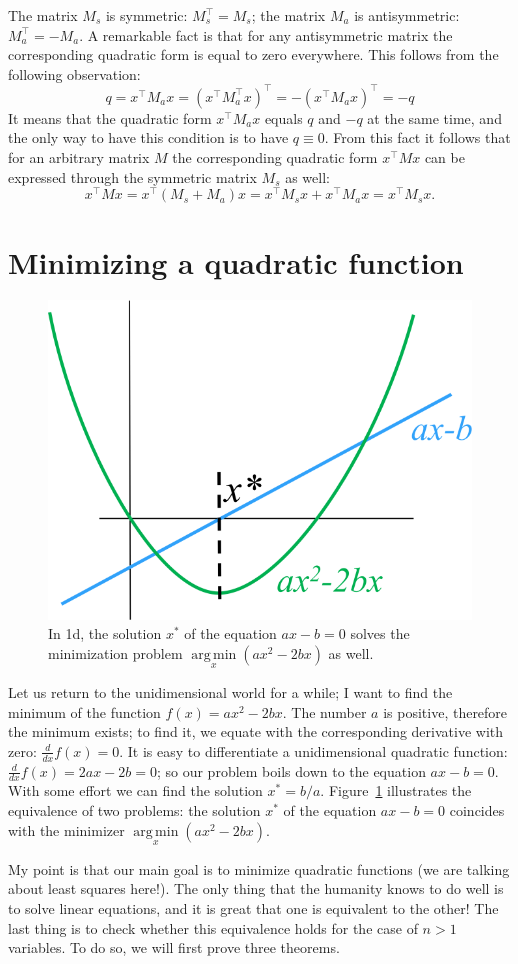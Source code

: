 \documentclass[notitlepage,oneside]{book}
\DeclareMathOperator*{\argmin}{arg\,min}
\begin{document}
The matrix $M_s$ is symmetric: $M_s^\top = M_s$; the matrix $M_a$ is antisymmetric: $M_a^\top=-M_a$.
A remarkable fact is that for any antisymmetric matrix the corresponding quadratic form is equal to zero everywhere. This follows from the following observation:
$$
q = x^\top M_a x  = (x^\top M_a^\top x)^\top = - (x^\top M_a x)^\top = -q
$$
It means that the quadratic form $x^\top M_a x$ equals $q$ and $-q$ at the same time, and the only way to have this condition is to have $q\equiv 0$.
From this fact it follows that for an arbitrary matrix $M$ the corresponding quadratic form $x^\top M x$ can be expressed through the symmetric matrix $M_s$ as well:
$$
x^\top M x = x^\top (M_s + M_a) x = x^\top M_s x  + x^\top M_a x = x^\top M_s x.
$$


\section{Minimizing a quadratic function}

\begin{figure}[ht]
	\centering
	\includegraphics[width=.3\linewidth]{img/minpb1d}
	\caption{In 1d, the solution $x^*$ of the equation $ax - b = 0$ solves the minimization problem $\argmin\limits_x(ax^2-2bx)$ as well. }
	\label{fig:min1d}
\end{figure}

Let us return to the unidimensional world for a while; I want to find the minimum of the function $f(x) = ax^2 - 2bx$. 
The number $a$ is positive, therefore the minimum exists; to find it, we equate with the corresponding derivative with zero: $\frac{d}{dx}f(x) = 0$. 
It is easy to differentiate a unidimensional quadratic function: $\frac{d}{dx}f(x) = 2ax - 2b = 0$; so our problem boils down to the equation $ax-b=0$.
With some effort we can find the solution $x^* = b/a$. Figure~\ref{fig:min1d} illustrates the equivalence of two problems:
the solution $x^*$ of the equation $ax-b=0$ coincides with the minimizer $\argmin\limits_x(ax^2 - 2bx)$.

My point is that our main goal is to minimize quadratic functions (we are talking about least squares here!).
The only thing that the humanity knows to do well is to solve linear equations, and it is great that one is equivalent to the other!
The last thing is to check whether this equivalence holds for the case of $n>1$ variables.
To do so, we will first prove three theorems.
\end{document}
